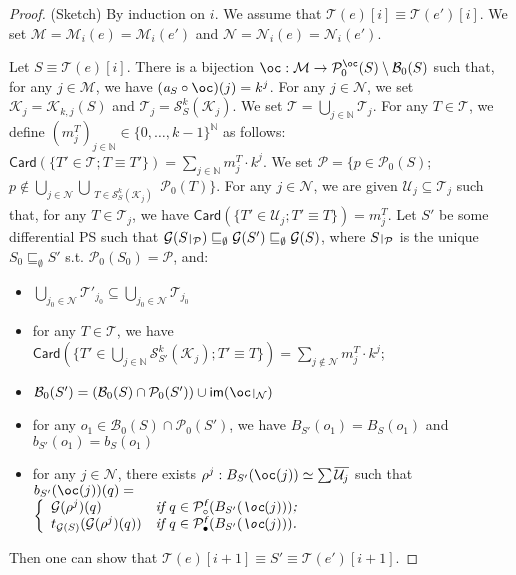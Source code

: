 \documentclass{article}
\newcommand{\target}[1]{t_{#1}}
\theoremstyle{plain}
\newcommand{\Nat}{\ensuremath{\mathbb{N}}}
\newcommand{\nontrivialconnected}[3]{\mathcal{S}_{#1}^{#3}(#2)}
\newcommand{\taylor}[2]{\mathcal{T}(#1)[#2]}
\newcommand{\criticalports}[3]{\mathcal{K}_{#2, #3}(#1)}
\newcommand{\groundof}[1]{\mathcal{G}(#1)}
\def\restriction#1#2{\mathchoice
              {\setbox1\hbox{${\displaystyle #1}_{\scriptstyle #2}$}
              \restrictionaux{#1}{#2}}
              {\setbox1\hbox{${\textstyle #1}_{\scriptstyle #2}$}
              \restrictionaux{#1}{#2}}
              {\setbox1\hbox{${\scriptstyle #1}_{\scriptscriptstyle #2}$}
              \restrictionaux{#1}{#2}}
              {\setbox1\hbox{${\scriptscriptstyle #1}_{\scriptscriptstyle #2}$}
              \restrictionaux{#1}{#2}}}
\def\restrictionaux#1#2{{#1\,\smash{\vrule height .8\ht1 depth .85\dp1}}_{\,#2}}
\newcommand{\im}[1]{\textsf{im}(#1)}
\newcommand{\cod}{\oc}
\newcommand{\portsatzero}[1]{\mathcal{P}_0(#1)}
\newcommand{\arity}[1]{{\textit{a}}_{#1}}
\newcommand{\Card}[1]{\textsf{Card}\left( #1 \right)}
\newcommand{\portsatzerooftype}[2]{\mathcal{P}_0^{#1}(#2)}
\newcommand{\conclusionscirc}[1]{\mathcal{P}_\circ^{\textsf{f}}(#1)}
\newcommand{\conclusionsnotcirc}[1]{\mathcal{P}_\bullet^{\textsf{f}}(#1)}
\newcommand{\boxesatzero}[1]{\mathcal{B}_{0}(#1)}
\begin{document}
\begin{proof}
(Sketch) By induction on $i$. We assume that $\taylor{e}{i} \equiv \taylor{e'}{i}$. We set $\mathcal{M} = \mathcal{M}_i(e) = \mathcal{M}_i(e')$ and $\mathcal{N} = \mathcal{N}_i(e) = \mathcal{N}_i(e')$.

Let $S \equiv \taylor{e}{i}$. There is a bijection $\cod : \mathcal{M} \to \portsatzerooftype{\cod}{S} \setminus \boxesatzero{S}$ such that, for any $j \in \mathcal{M}$,  we have  $(\arity{S} \circ \cod)(j) = k^j$. 
For any $j \in \mathcal{N}$, we set $\mathcal{K}_j = \criticalports{S}{k}{j}$ and $\mathcal{T}_{j} = \nontrivialconnected{S}{\mathcal{K}_{j}}{k}$. We set $\mathcal{T} = \bigcup_{j \in \Nat} \mathcal{T}_j$. For any $T \in \mathcal{T}$, we define $(m_j^T)_{j \in \Nat} \in {\{ 0, \ldots, k-1 \}}^\Nat$ as follows: $\Card{\{ T' \in \mathcal{T} ; T \equiv T'\}} = \sum_{j \in \Nat} m_j^T \cdot k^j$. We set $\mathcal{P} =  \{ p \in \portsatzero{S} ; $ $p \notin \bigcup_{j \in \mathcal{N}} \bigcup_{\begin{array}{c} T \in \nontrivialconnected{S}{\mathcal{K}_j}{k} \end{array}} \portsatzero{T} \}$. 
For any $j \in \mathcal{N}$, we are given $\mathcal{U}_j \subseteq \mathcal{T}_j$ such that, for any $T \in \mathcal{T}_j$, we have $\Card{\{ T' \in \mathcal{U}_j ; T' \equiv T \}} = m_j^T$. Let $S'$ be some differential PS such that $\groundof{\restriction{S}{\mathcal{P}}} \sqsubseteq_\emptyset \groundof{S'} \sqsubseteq_\emptyset \groundof{S}$, where $\restriction{S}{\mathcal{P}}$ is the unique $S_0 \sqsubseteq_{\emptyset} S'$ s.t. $\portsatzero{S_0} = \mathcal{P}$, and:
\begin{itemize}
\item $\bigcup_{j_0 \in \mathcal{N}} \mathcal{T'}_{j_0} \subseteq \bigcup_{j_0 \in \mathcal{N}} \mathcal{T}_{j_0}$
\item for any $T \in \mathcal{T}$, we have 
$\Card{\{ T' \in \bigcup_{j \in \Nat} \nontrivialconnected{S'}{\mathcal{K}_{j}}{k} ; T' \equiv T \}} = \sum_{j \notin \mathcal{N}} m_j^T \cdot k^j$;
\item $\boxesatzero{S'} = (\boxesatzero{S} \cap \portsatzero{S'}) \cup \im{\restriction{\cod}{\mathcal{N}}}$
\item for any $o_1 \in \boxesatzero{S} \cap \portsatzero{S'}$, we have $B_{S'}(o_1) = B_S(o_1)$ and $b_{S'}(o_1) = b_S(o_1)$
\item for any $j \in \mathcal{N}$, there exists $\rho^j : B_{S'}(\cod(j)) \simeq \sum \overline{\mathcal{U}_j}$ such that $b_{S'}(\cod(j))(q) =$\\ $\left\lbrace \begin{array}{ll} 
{\groundof{\rho^{j}}}(q) & \textit{if $q \in \conclusionscirc{B_{S'}(\cod(j))}$;}\\
\target{\groundof{S}}(\groundof{\rho^{j}}(q)) & \textit{if $q \in \conclusionsnotcirc{B_{S'}(\cod(j))}$.}
\end{array} \right.$
\end{itemize}
Then one can show that $\taylor{e}{i+1} \equiv S' \equiv \taylor{e'}{i+1}$.
\end{proof}
\end{document}
